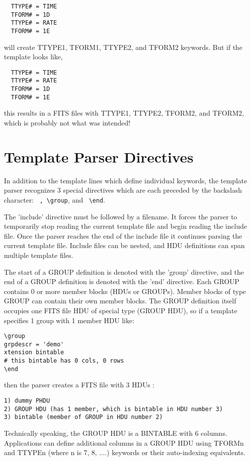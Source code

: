 \documentclass[11pt]{book}
\begin{document}
\begin{verbatim}
  TTYPE# = TIME
  TFORM# = 1D
  TTYPE# = RATE
  TFORM# = 1E
\end{verbatim}
will create TTYPE1, TFORM1, TTYPE2, and TFORM2 keywords.  But if the
template looks like,

\begin{verbatim}
  TTYPE# = TIME
  TTYPE# = RATE
  TFORM# = 1D
  TFORM# = 1E
\end{verbatim}
this results in a FITS files with  TTYPE1, TTYPE2, TFORM2, and TFORM2,
which is probably not what was intended!


\section{Template Parser Directives}

In addition to the template lines which define individual keywords, the
template parser recognizes 3 special directives which are each preceded
by the backslash character:  \verb+ , \group+, and \verb+ \end+.

The 'include' directive must be followed by a filename. It forces the
parser to temporarily stop reading the current template file and begin
reading the include file. Once the parser reaches the end of the
include file it continues parsing the current template file.  Include
files can be nested, and HDU definitions can span multiple template
files.

The start of a GROUP definition is denoted with the 'group' directive,
and the end of a GROUP definition is denoted with the 'end' directive.
Each GROUP contains 0 or more member blocks (HDUs or GROUPs). Member
blocks of type GROUP can contain their own member blocks. The GROUP
definition itself occupies one FITS file HDU of special type (GROUP
HDU), so if a template specifies 1 group with 1 member HDU like:

\begin{verbatim}
\group
grpdescr = 'demo'
xtension bintable
# this bintable has 0 cols, 0 rows
\end
\end{verbatim}
then the parser creates a FITS file with 3 HDUs :

\begin{verbatim}
1) dummy PHDU
2) GROUP HDU (has 1 member, which is bintable in HDU number 3)
3) bintable (member of GROUP in HDU number 2)
\end{verbatim}
Technically speaking, the GROUP HDU is a BINTABLE with 6 columns. Applications
can define additional columns in a GROUP HDU using TFORMn and TTYPEn
(where n is 7, 8, ....) keywords or their auto-indexing equivalents.
\end{document}
